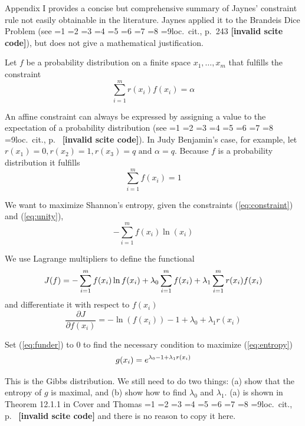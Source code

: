 \documentclass[12pt]{article}
\newif\ifNumericalOrYear
\newcommand{\PageP}{p.~}
\newcommand{\PageP}{}
\newcommand{\nias}{\noindent} %
\newcommand{\scite}[3]{\ifnum#1=1\ifNumericalOrYear\citep{#2}\else\citeyearpar{#2}\fi\else
\ifnum#1=2\ifNumericalOrYear\citep[#3]{#2}\else\citep[{\PageP}#3]{#2}\fi\else
\ifnum#1=3\ifNumericalOrYear(\citet[#3]{#2})\else\citep[{\PageP}#3]{#2}\fi\else
\ifnum#1=4\ifNumericalOrYear\citet{#2}\else\citet{#2}\fi\else
\ifnum#1=5\ifNumericalOrYear(\citet{#2})\else\citep{#2}\fi\else
\ifnum#1=6\ifNumericalOrYear(\citet[#3]{#2})\else\citep[{\PageP}#3]{#2}\fi\else
\ifnum#1=7\ifNumericalOrYear\citep{#2}\else\citealp{#2}\fi\else
\ifnum#1=8\ifNumericalOrYear\citep[#3]{#2}\else\citealp[{\PageP}#3]{#2}\fi\else
\ifnum#1=9\ifNumericalOrYear\citep[#3]{#2}\else{}loc.\ cit., {\PageP}#3\fi\else
\textbf{[invalid scite code]}\fi\fi\fi\fi\fi\fi\fi\fi\fi}
\begin{document}
\nias Appendix I provides a concise but comprehensive summary of
Jaynes' constraint rule not easily obtainable in the literature.
Jaynes applied it to the Brandeis Dice Problem (see
\scite{8}{jaynes89}{243}), but does not give a mathematical
justification.

Let $f$ be a probability distribution on a finite space
$x_{1},\ldots,x_{m}$ that fulfills the constraint 
\begin{equation}
  \label{eq:constraint}
\sum_{i=1}^{m}r(x_{i})f(x_{i})=\alpha
\end{equation}

An affine constraint can always be expressed by assigning a value to
the expectation of a probability distribution (see
\scite{7}{hobson71}{}). In Judy Benjamin's case, for example, let
$r(x_{1})=0, r(x_{2})=1, r(x_{3})=q\mbox{ and }\alpha=q$. Because $f$
is a probability distribution it fulfills
\begin{equation}
  \label{eq:unity}
\sum_{i=1}^{m}f(x_{i})=1
\end{equation}

We want to maximize Shannon's entropy, given the constraints
({\ref{eq:constraint}}) and ({\ref{eq:unity}}),
\begin{equation}
  \label{eq:entropy}
-\sum_{i=1}^{m}f(x_{i})\ln(x_{i})
\end{equation}

We use Lagrange multipliers to define the functional
\begin{equation}
  \label{eq:functional}
J(f)=-\sum_{i=1}^{m}f(x_{i})\ln{}f(x_{i})+\lambda_{0}\sum_{i=1}^{m}f(x_{i})+\lambda_{1}\sum_{i=1}^{m}r(x_{i})f(x_{i})\notag
\end{equation}
and differentiate it with respect to $f(x_{i})$
\begin{equation}
  \label{eq:funder}
\frac{\partial{}J}{\partial{}f(x_{i})}=-\ln(f(x_{i}))-1+\lambda_{0}+\lambda_{1}r(x_{i})
\end{equation}

Set ({\ref{eq:funder}}) to $0$ to find the necessary condition to
maximize ({\ref{eq:entropy}})
\begin{equation}
  \label{eq:coverthomas}
g(x_{i})=e^{\lambda_{0}-1+\lambda_{1}r(x_{i})}\notag
\end{equation}

This is the Gibbs distribution. We still need to do two things: (a)
show that the entropy of $g$ is maximal, and (b) show how to find
$\lambda_{0}$ and $\lambda_{1}$. (a) is shown in Theorem 12.1.1 in
Cover and Thomas \scite{1}{coverthomas06}{} and there is no reason to
copy it here. 
\end{document}
